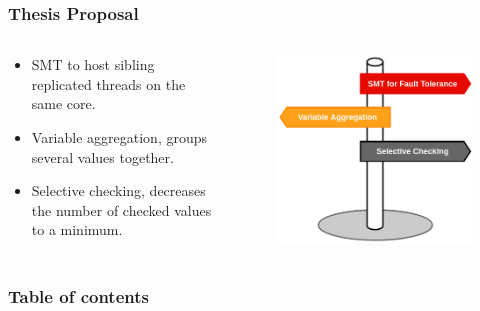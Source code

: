\documentclass[xcolor=pdftex,dvipsnames,table]{beamer}
\begin{document}
\begin{frame}
	\frametitle{Thesis Proposal}		
	
	\begin{columns}[c]
		\column{2.3in}
		\begin{tcolorbox}[colback=blue!5,colframe=blue!40!black,title=Improve RMT performance]
            \begin{itemize}
        	    \item SMT to host sibling replicated threads on the same core.
        	    \item Variable aggregation, groups several values together.
        	    \item Selective checking, decreases the number of checked values to a minimum. 
            \end{itemize}
        \end{tcolorbox}
		
        \column{2in}
            \begin{figure}[H]
        	    \begin{center}
            	    \includegraphics[scale=0.45]{3WaySign.png}
        	    \end{center}
       	    \end{figure}  
   	\end{columns}
	
\end{frame}

\begin{frame}
	\frametitle{Table of contents}
	\tableofcontents
\end{frame}
\end{document}
